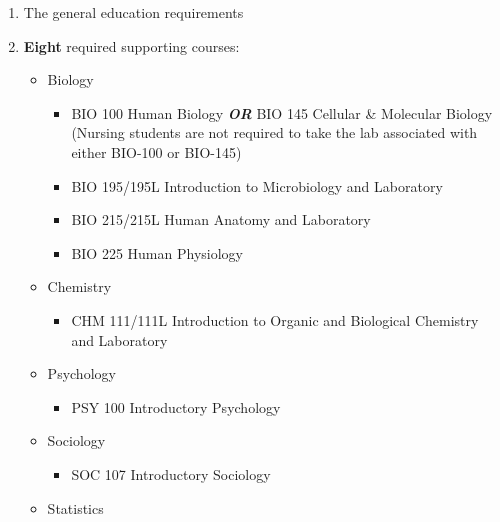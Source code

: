 \documentclass[
  letterpaper,
]{scrbook}
\providecommand{\tightlist}{%
  \setlength{\itemsep}{0pt}\setlength{\parskip}{0pt}}
\begin{document}
\begin{enumerate}
\def\labelenumi{\arabic{enumi}.}
\tightlist
\item
  The general education requirements\\
\item
  \textbf{Eight} required supporting courses:

  \begin{itemize}
  \tightlist
  \item
    Biology

    \begin{itemize}
    \tightlist
    \item
      BIO 100 Human Biology \textbf{\emph{OR}} BIO 145 Cellular \&
      Molecular Biology (Nursing students are not required to take the
      lab associated with either BIO-100 or BIO-145)\\
    \item
      BIO 195/195L Introduction to Microbiology and Laboratory\\
    \item
      BIO 215/215L Human Anatomy and Laboratory\\
    \item
      BIO 225 Human Physiology\\
    \end{itemize}
  \item
    Chemistry

    \begin{itemize}
    \tightlist
    \item
      CHM 111/111L Introduction to Organic and Biological Chemistry and
      Laboratory\\
    \end{itemize}
  \item
    Psychology

    \begin{itemize}
    \tightlist
    \item
      PSY 100 Introductory Psychology\\
    \end{itemize}
  \item
    Sociology

    \begin{itemize}
    \tightlist
    \item
      SOC 107 Introductory Sociology\\
    \end{itemize}
  \item
    Statistics


\end{itemize}
\end{enumerate}
\end{document}

